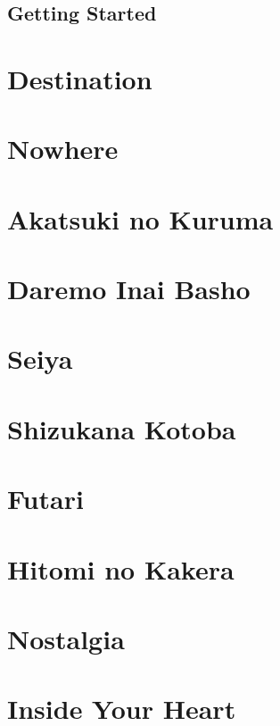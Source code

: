 \documentclass[twocolumn,letterpaper]{report}
\begin{document}
\section{Getting Started}

\chapter{Destination}
\chapter{Nowhere}
\chapter{Akatsuki no Kuruma}
\chapter{Daremo Inai Basho}
\chapter{Seiya}
\chapter{Shizukana Kotoba}
\chapter{Futari}
\chapter{Hitomi no Kakera}
\chapter{Nostalgia}
\chapter{Inside Your Heart}
\end{document}
